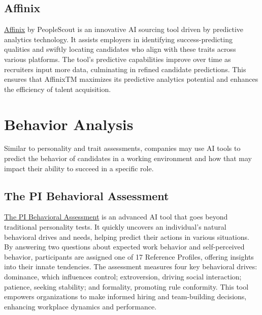 \documentclass[
]{book}
\begin{document}
\hypertarget{affinix}{%
\subsection{Affinix}\label{affinix}}

\href{https://www.peoplescout.com/technology/}{Affinix} by PeopleScout is an innovative AI sourcing tool driven by predictive analytics technology. It assists employers in identifying success-predicting qualities and swiftly locating candidates who align with these traits across various platforms. The tool's predictive capabilities improve over time as recruiters input more data, culminating in refined candidate predictions. This ensures that AffinixTM maximizes its predictive analytics potential and enhances the efficiency of talent acquisition.

\hypertarget{behavior-analysis}{%
\section{Behavior Analysis}\label{behavior-analysis}}

Similar to personality and trait assessments, companies may use AI tools to predict the behavior of candidates in a working environment and how that may impact their ability to succeed in a specific role.

\hypertarget{the-pi-behavioral-assessment}{%
\subsection{The PI Behavioral Assessment}\label{the-pi-behavioral-assessment}}

\href{https://www.predictiveindex.com/assessments/behavioral-assessment/?creative=655858294556\&keyword=predictive\%20personality\%20test\&matchtype=b\&network=g\&device=c\&utm_source=google\&utm_medium=ppc\&utm_content=bofu-brand-low-value\&device=c\&matchtype=b\&utm_term=predictive\%20personality\%20test\&gad=1\&gclid=Cj0KCQjwldKmBhCCARIsAP-0rfw2xB87svR2BFTESJ6nSMzDqIs8ni8VKXiD1robOSabO6uU7wTWjagaAoHUEALw_wcB}{The PI Behavioral Assessment} is an advanced AI tool that goes beyond traditional personality tests. It quickly uncovers an individual's natural behavioral drives and needs, helping predict their actions in various situations. By answering two questions about expected work behavior and self-perceived behavior, participants are assigned one of 17 Reference Profiles, offering insights into their innate tendencies. The assessment measures four key behavioral drives: dominance, which influences control; extroversion, driving social interaction; patience, seeking stability; and formality, promoting rule conformity. This tool empowers organizations to make informed hiring and team-building decisions, enhancing workplace dynamics and performance.
\end{document}
